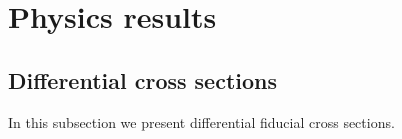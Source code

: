 

\chapter{Physics results}\label{chap:physicsResults}

\section{Differential cross sections}

In this subsection we present differential fiducial cross sections.

